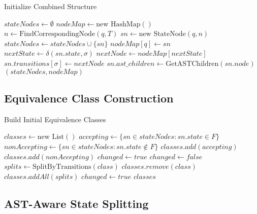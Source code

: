 \documentclass[12pt]{article}
\begin{document}
\begin{algorithm}
\caption{Initialize Combined Structure}
\begin{algorithmic}[1]
    \State $stateNodes \gets \emptyset$
    \State $nodeMap \gets \text{new HashMap}()$
        \State $n \gets \text{FindCorrespondingNode}(q, T)$
        \State $sn \gets \text{new StateNode}(q, n)$
        \State $stateNodes \gets stateNodes \cup \{sn\}$
        \State $nodeMap[q] \gets sn$
    \EndFor
        \For{$\sigma \in \Sigma$}
            \State $nextState \gets \delta(sn.state, \sigma)$
            \State $nextNode \gets nodeMap[nextState]$
            \State $sn.transitions[\sigma] \gets nextNode$
        \EndFor
        \State $sn.ast\_children \gets \text{GetASTChildren}(sn.node)$
    \EndFor
    \State \Return $(stateNodes, nodeMap)$
\EndProcedure
\end{algorithmic}
\end{algorithm}

\subsection{Equivalence Class Construction}

\begin{algorithm}
\caption{Build Initial Equivalence Classes}
\begin{algorithmic}[1]
    \State $classes \gets \text{new List}()$
    \State $accepting \gets \{sn \in stateNodes : sn.state \in F\}$
    \State $nonAccepting \gets \{sn \in stateNodes : sn.state \notin F\}$
    \State $classes.add(accepting)$
    \State $classes.add(nonAccepting)$
    \State $changed \gets true$
        \State $changed \gets false$
            \State $splits \gets \text{SplitByTransitions}(class)$
                \State $classes.remove(class)$
                \State $classes.addAll(splits)$
                \State $changed \gets true$
            \EndIf
        \EndFor
    \EndWhile
    \State \Return $classes$
\EndProcedure
\end{algorithmic}
\end{algorithm}

\subsection{AST-Aware State Splitting}
\end{document}
